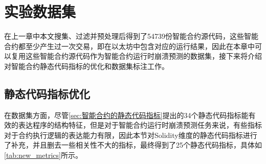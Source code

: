 \section{实验数据集}
\label{sec:实验数据集}

在上一章中本文搜集、过滤并预处理后得到了54739份智能合约源代码，这些智能合约都至少产生过一次交易，即在以太坊中包含对应的运行结果，因此在本章中可以复用这些智能合约源代码作为智能合约运行时崩溃预测的数据集，接下来将介绍对智能合约静态代码指标的优化和数据集标注工作。
\subsection{静态代码指标优化}
在数据集方面，尽管\autoref{sec:智能合约的静态代码指标}提出的34个静态代码指标能有效的表达程序的结构特征，但是对于智能合约运行时崩溃预测任务来说，有些指标对于合约执行逻辑的表达能力有限，因此本节对Solidity维度的静态代码指标进行了补充，并且删去一些相关性不大的指标，最终得到了25个静态代码指标，具体如\autoref{tab:new_metrics}所示。
